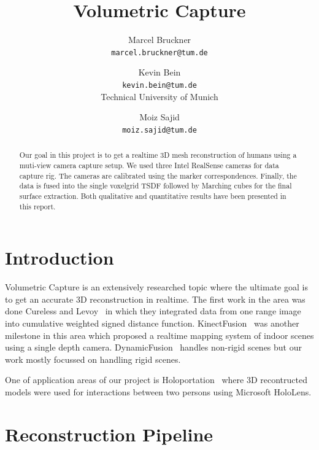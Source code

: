 \documentclass[10pt,twocolumn,letterpaper]{article}
\begin{document}
\title{Volumetric Capture}

\author{Marcel Bruckner\\
{\tt\small marcel.bruckner@tum.de}
\and
Kevin Bein\\
{\tt\small kevin.bein@tum.de}\\
Technical University of Munich
\and
Moiz Sajid\\
{\tt\small moiz.sajid@tum.de}
}

\maketitle

\begin{abstract}
   Our goal in this project is to get a realtime 3D mesh reconstruction of humans using a muti-view camera capture setup. We used three Intel RealSense cameras for data capture rig. The cameras are calibrated using the marker correspondences. Finally, the data is fused into the single voxelgrid TSDF followed by Marching cubes for the final surface extraction. Both qualitative and quantitative results have been presented in this report.   
\end{abstract}

\section{Introduction}

Volumetric Capture is an extensively researched topic where the ultimate goal is to get an accurate 3D reconstruction in realtime. The first work in the area was done Cureless and Levoy~\cite{Authors4} in which they integrated data from one range image into cumulative weighted signed distance function. KinectFusion~\cite{Authors5} was another milestone in this area which proposed a realtime mapping system of indoor scenes using a single depth camera. DynamicFusion~\cite{Authors6} handles non-rigid scenes but our work mostly focussed on handling rigid scenes. 

One of application areas of our project is Holoportation~\cite{Authors7} where 3D recontructed models were used for interactions between two persons using Microsoft HoloLens.

\section{Reconstruction Pipeline}
\end{document}
